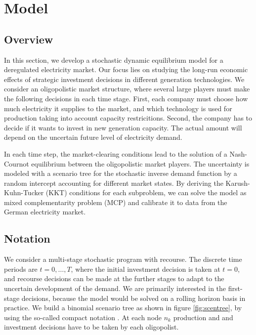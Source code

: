 \section{Model}
\label{sec:model}

\subsection{Overview}

In this section, we develop a stochastic dynamic equilibrium model for a deregulated electricity market. Our focus lies on studying the long-run economic effects of strategic investment decisions in different generation technologies. We consider an oligopolistic market structure, where several large players must make the following decisions in each time stage. First, each company must choose how much electricity it supplies to the market, and which technology is used for production taking into account capacity restricitions. Second, the company has to decide if it wants to invest in new generation capacity. The actual amount will depend on the uncertain future level of electricity demand.

In each time step, the market-clearing conditions lead to the solution of a Nash-Cournot equilibrium between the oligopolistic market players. The uncertainty is modeled with a scenario tree for the stochastic inverse demand function by a random intercept accounting for different market states. By deriving the Karush-Kuhn-Tucker (KKT) conditions for each subproblem, we can solve the model as mixed complementarity problem (MCP) and calibrate it to data from the German electricity market.

\subsection{Notation}

We consider a multi-stage stochastic program with recourse. The discrete time periods are $t=0,\dots,T$, where the initial investment decision is taken at $t=0$, and recourse decisions can be made at the further stages to adapt to the uncertain development of the demand. We are primarily interested in the first-stage decisions, because the model would be solved on a rolling horizon basis in practice. We build a binomial scenario tree as shown in figure \ref{fig:scentree}, by using the so-called compact notation \cite[see e.g.][]{Brandimarte2006}.  At each node $n_k$ production and and investment decisions have to be taken by each oligopolist.

